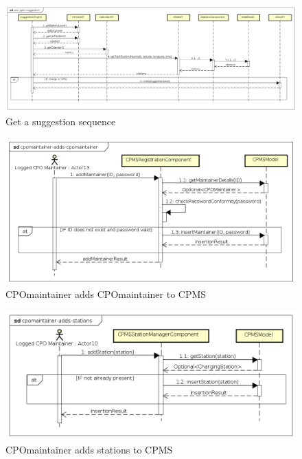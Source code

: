 \begin{figure}[!h]
    \begin{center}
        \includegraphics[keepaspectratio, width=16cm]{Sequence/user-gets-suggestion.png}
        \caption{Get a suggestion sequence}
        \label{fig:user-gets-suggestion}
    \end{center}
\end{figure}
\begin{figure}[!h]
    \begin{center}
        \includegraphics[keepaspectratio, width=16cm]{Sequence/cpomaintainer-adds-cpomaintainer.png}
        \caption{\ac{CPO}maintainer adds \ac{CPO}maintainer to \ac{CPMS}}
        \label{fig:cpomaintainer-adds-cpomaintainer}
    \end{center}
\end{figure}
\begin{figure}[!h]
    \begin{center}
        \includegraphics[keepaspectratio, width=16cm]{Sequence/cpomaintainer-adds-stations.png}
        \caption{\ac{CPO}maintainer adds stations to \ac{CPMS}}
        \label{fig:cpomaintainer-adds-stations}
    \end{center}
\end{figure}
